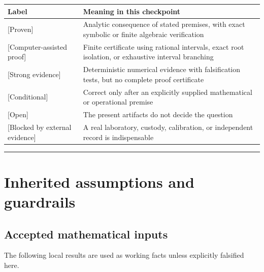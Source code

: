 \documentclass[11pt,a4paper,openany]{report}
\newcommand{\statusProven}{\textcolor{fingreen}{[Proven]}}
\newcommand{\statusStrong}{\textcolor{finblue}{[Strong evidence]}}
\begin{document}
\begin{center}
\begingroup\small
\setlength{\tabcolsep}{2.5pt}
\renewcommand{\arraystretch}{1.16}
\begin{longtable}{@{}p{}p{}@{}}
\toprule
\textbf{Label} & \textbf{Meaning in this checkpoint} \\
\midrule
\endhead
\statusProven{} & Analytic consequence of stated premises, with exact symbolic or finite algebraic verification \\
\textcolor{fingreen}{[Computer-assisted proof]} & Finite certificate using rational intervals, exact root isolation, or exhaustive interval branching \\
\statusStrong{} & Deterministic numerical evidence with falsification tests, but no complete proof certificate \\
\textcolor{finviolet}{[Conditional]} & Correct only after an explicitly supplied mathematical or operational premise \\
\textcolor{finorange}{[Open]} & The present artifacts do not decide the question \\
\textcolor{finred}{[Blocked by external evidence]} & A real laboratory, custody, calibration, or independent record is indispensable \\
\bottomrule
\end{longtable}
\endgroup
\end{center}

\par\medskip\hrule\medskip

\chapter{Inherited assumptions and guardrails}

\section{Accepted mathematical inputs}

The following local results are used as working facts unless explicitly falsified here.
\end{document}
